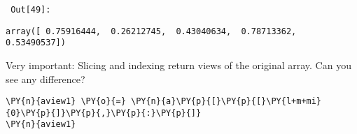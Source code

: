         {\par%
        \vspace{-1\smallerfontscale}%
        \noindent%
        \begin{minipage}{\cellleftmargin}%
    \hfill%
    {\smaller%
    \tt%
    \color{nbframe-out-prompt}%
    Out[49]:}%
    \hspace{\inputpadding}%
    \hspace{0em}%
    \hspace{3pt}%
    \end{minipage}%
        }%
    \begin{addmargin}[\cellleftmargin]{0em}%
    {\smaller%
    \vspace{-1\smallerfontscale}%
    
    
    
    \begin{verbatim}
array([ 0.75916444,  0.26212745,  0.43040634,  0.78713362,  0.53490537])
    \end{verbatim}

    
}%
    \end{addmargin}%
    Very important: Slicing and indexing return views of the original array.
Can you see any difference?


{\par%
\vspace{-1\baselineskip}%
}%
\begin{notebookcell}[50]%
\begin{addmargin}[\cellleftmargin]{0em}%
{\smaller%
\par%
%
\vspace{-1\smallerfontscale}%
\begin{Verbatim}[commandchars=\\\{\}]
\PY{n}{aview1} \PY{o}{=} \PY{n}{a}\PY{p}{[}\PY{p}{[}\PY{l+m+mi}{0}\PY{p}{]}\PY{p}{,}\PY{p}{:}\PY{p}{]}
\PY{n}{aview1}
\end{Verbatim}
%
\par%
\vspace{-1\smallerfontscale}}%
\end{addmargin}
\end{notebookcell}

\par\vspace{1\smallerfontscale}%
    
